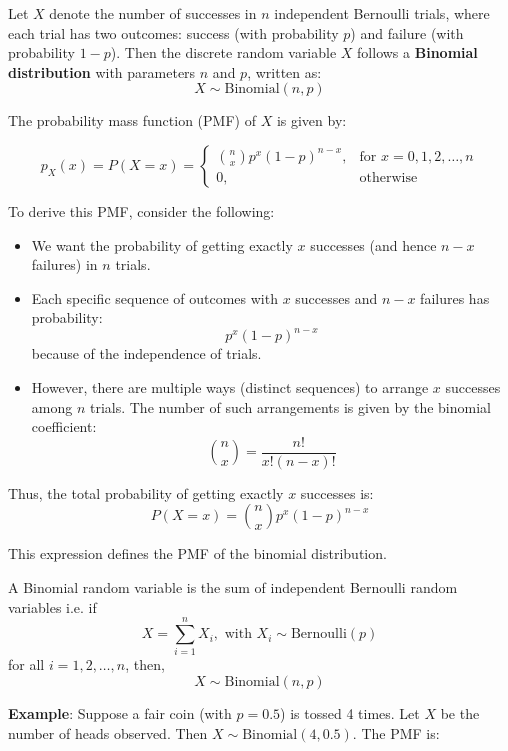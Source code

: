 \documentclass[twoside]{book}
\begin{document}
Let $X$ denote the number of successes in $n$ independent Bernoulli trials, where each trial has two outcomes: {success} (with probability $p$) and {failure} (with probability $1 - p$).
Then the discrete random variable $X$ follows a \textbf{Binomial distribution} with parameters $n$ and $p$, written as:
\[
X \sim \text{Binomial}(n, p)
\]

The probability mass function (PMF) of $X$ is given by:
\begin{textbox}
\[
p_X(x) = P(X = x) =
\begin{cases}
\binom{n}{x} p^x (1 - p)^{n - x}, & \text{for } x = 0, 1, 2, \ldots, n \\
0, & \text{otherwise}
\end{cases}
\]

\end{textbox}

To derive this PMF, consider the following:

\begin{itemize}
    \item We want the probability of getting exactly $x$ successes (and hence $n - x$ failures) in $n$ trials.
    \item Each specific sequence of outcomes with $x$ successes and $n - x$ failures has probability:
    \[
    p^x (1 - p)^{n - x}
    \]
    because of the independence of trials.
    \item However, there are multiple ways (distinct sequences) to arrange $x$ successes among $n$ trials. The number of such arrangements is given by the binomial coefficient:
    \[
    \binom{n}{x} = \frac{n!}{x!(n - x)!}
    \]
\end{itemize}

Thus, the total probability of getting exactly $x$ successes is:
\[
P(X = x) = \binom{n}{x} p^x (1 - p)^{n - x}
\]

This expression defines the PMF of the binomial distribution.

\begin{textbox}
    A Binomial random variable is the sum of independent Bernoulli random variables i.e. if $$X=\sum_{i=1}^{n} X_i, \text{ with } X_i\sim \text{Bernoulli}(p)$$ for all $i = 1,2,\dots, n$,
    then, $$X\sim \text{Binomial}(n, p)$$
\end{textbox}

\vspace{2mm}

\textbf{Example}: Suppose a fair coin (with $p = 0.5$) is tossed 4 times. Let $X$ be the number of heads observed. Then $X \sim \text{Binomial}(4, 0.5)$. The PMF is:
\end{document}
